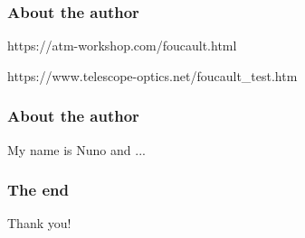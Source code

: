 \documentclass{beamer}
\begin{document}
\begin{frame}
\frametitle{About the author}
https://atm-workshop.com/foucault.html

https://www.telescope-optics.net/foucault_test.htm
\end{frame}

\begin{frame}
\frametitle{About the author}
My name is Nuno and ...
\end{frame}

\begin{frame}
\frametitle{The end}
Thank you!
\end{frame}
\end{document}
